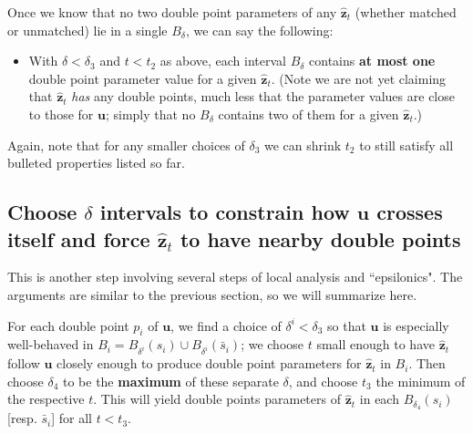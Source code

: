 \documentclass[12pt]{article}
\numberwithin{equation}{subsection}
\theoremstyle{definition}
\numberwithin{lem}{section}
\def\uu{\mathbf{u}}
\def\zhat{\mathbf{\hat{z}}}
\begin{document}
Once we know that no two double point parameters of any $\zhat_t$ (whether matched or unmatched) lie in a single $B_\delta$, we can say the following:

\begin{itemize}
\item With $\delta<\delta_3$ and $t < t_2$ as above, each interval $B_\delta$ contains {\bf at most one} double point parameter value for a given $\zhat_t$.  (Note we are not yet claiming that $\zhat_t$ {\em has} any double points, much less that the parameter values are close to those for $\uu$; simply that no $B_\delta$ contains two of them for a given $\zhat_t$.)
 \end{itemize}
 
 Again, note that for any smaller choices of $\delta_3$  we can shrink $t_2$ to still satisfy all bulleted properties listed so far.


\subsection{Choose $\delta$ intervals to constrain how  $\uu$ crosses itself and force $\zhat_t$ to have nearby double points}
\label{FindDoublePointsOfZ}
This is another step involving  several steps of local analysis and ``epsilonics". The arguments are similar to the previous section, so we will summarize here.

For each double point $p_i$ of $\uu$, we find a choice of $\delta^i< \delta_3$ so that $\uu$ is especially well-behaved in $B_i = B_{\delta^i}(s_i) \cup B_{\delta^i}(\bar{s}_i)$; we choose $t$ small enough to have $\zhat_t$ follow $\uu$ closely enough to produce double point parameters for $\zhat_t$ in $B_i$.  Then choose $\delta_4$ to be the {\bf maximum}  of these separate $\delta$, and choose $t_3$ the minimum of the respective $t$. This will yield double points parameters of $\zhat_t$ in each $B_{\delta_4}(s_i)$ [resp. $\bar{s}_i$] for all $t<t_3$.
 
\end{document}

